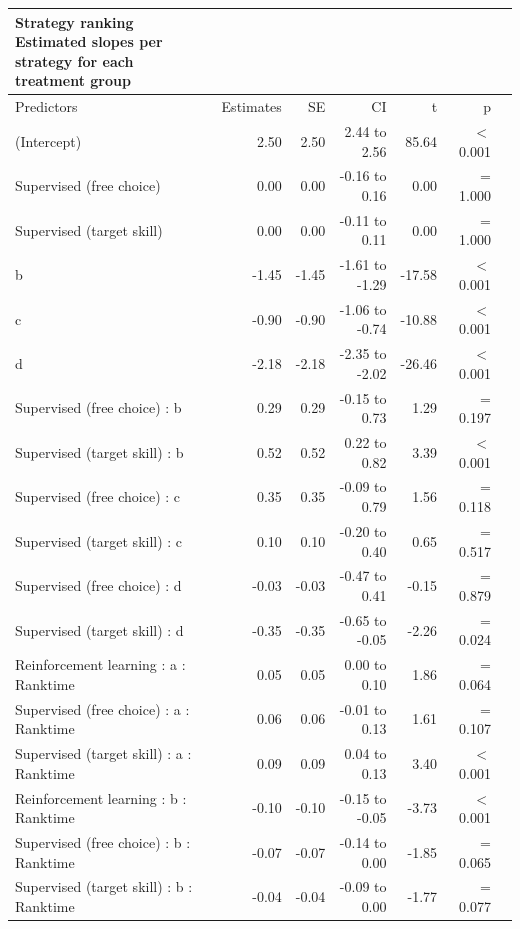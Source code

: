 \documentclass{article}
\begin{document}
\setlength{\LTpost}{0mm}
\begin{longtable}{lrrrrrl}
\caption*{
{\large Strategy ranking} \\ 
{\small Estimated slopes per strategy for each treatment group}
} \\ 
\toprule
Predictors & Estimates & SE & CI & t & p \\ 
\midrule\addlinespace[2.5pt]
(Intercept) & 2.50 & 2.50 & 2.44 to 2.56 & 85.64 &  $<$  0.001 \\ 
Supervised (free choice) & 0.00 & 0.00 & -0.16 to 0.16 & 0.00 &  =  1.000 \\ 
Supervised (target skill)  & 0.00 & 0.00 & -0.11 to 0.11 & 0.00 &  =  1.000 \\ 
b & -1.45 & -1.45 & -1.61 to -1.29 & -17.58 &  $<$  0.001 \\ 
c  & -0.90 & -0.90 & -1.06 to -0.74 & -10.88 &  $<$  0.001 \\ 
d & -2.18 & -2.18 & -2.35 to -2.02 & -26.46 &  $<$  0.001 \\ 
Supervised (free choice) : b & 0.29 & 0.29 & -0.15 to 0.73 & 1.29 &  =  0.197 \\ 
Supervised (target skill) : b & 0.52 & 0.52 & 0.22 to 0.82 & 3.39 &  $<$  0.001 \\ 
Supervised (free choice) : c & 0.35 & 0.35 & -0.09 to 0.79 & 1.56 &  =  0.118 \\ 
Supervised (target skill)  : c & 0.10 & 0.10 & -0.20 to 0.40 & 0.65 &  =  0.517 \\ 
Supervised (free choice) : d & -0.03 & -0.03 & -0.47 to 0.41 & -0.15 &  =  0.879 \\ 
Supervised (target skill)  : d & -0.35 & -0.35 & -0.65 to -0.05 & -2.26 &  =  0.024 \\ 
Reinforcement learning : a : Ranktime & 0.05 & 0.05 & 0.00 to 0.10 & 1.86 &  =  0.064 \\ 
Supervised (free choice) : a : Ranktime & 0.06 & 0.06 & -0.01 to 0.13 & 1.61 &  =  0.107 \\ 
Supervised (target skill) : a : Ranktime & 0.09 & 0.09 & 0.04 to 0.13 & 3.40 &  $<$  0.001 \\ 
Reinforcement learning : b : Ranktime & -0.10 & -0.10 & -0.15 to -0.05 & -3.73 &  $<$  0.001 \\ 
Supervised (free choice) : b : Ranktime & -0.07 & -0.07 & -0.14 to 0.00 & -1.85 &  =  0.065 \\ 
Supervised (target skill) : b : Ranktime & -0.04 & -0.04 & -0.09 to 0.00 & -1.77 &  =  0.077 \\ 

\end{longtable}
\end{document}
